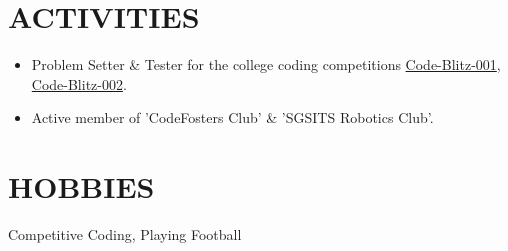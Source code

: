 \documentclass[line, margin]{res}
\begin{document}
\begin{resume}
\section{ACTIVITIES}
\begin{itemize}
\item Problem Setter \& Tester for the college coding competitions \href{https://www.hackerrank.com/contests/code-blitz-001/challenges}{Code-Blitz-001}, \href{https://www.hackerrank.com/contests/code-blitz-002/challenges}{Code-Blitz-002}.
\item Active member of 'CodeFosters Club' \& 'SGSITS Robotics Club'.
\end{itemize}

\section{HOBBIES}
Competitive Coding, Playing Football

\end{resume}
\end{document}
